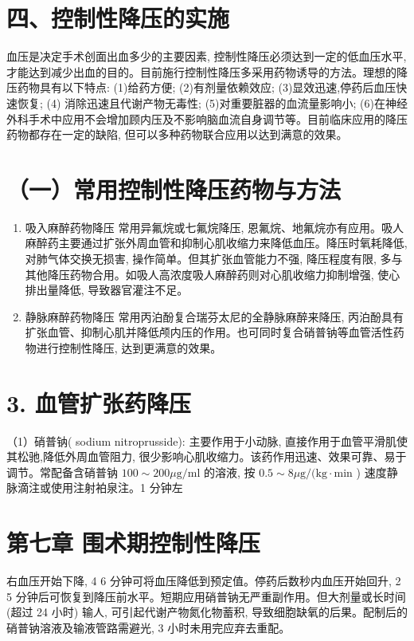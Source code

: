 \documentclass[10pt]{article}
\begin{document}
\section*{四、控制性降压的实施}
血压是决定手术创面出血多少的主要因素, 控制性降压必须达到一定的低血压水平, 才能达到减少出血的目的。目前施行控制性降压多采用药物诱导的方法。理想的降压药物具有以下特点: (1)给药方便; (2)有剂量依赖效应; (3)显效迅速,停药后血压快速恢复; (4) 消除迅速且代谢产物无毒性; (5)对重要脏器的血流量影响小; (6)在神经外科手术中应用不会增加顾内压及不影响脑血流自身调节等。目前临床应用的降压药物都存在一定的缺陷, 但可以多种药物联合应用以达到满意的效果。

\section*{（一）常用控制性降压药物与方法}
\begin{enumerate}
  \item 吸入麻醉药物降压 常用异氟烷或七氟烷降压, 恩氟烷、地氟烷亦有应用。吸人麻醉药主要通过扩张外周血管和抑制心肌收缩力来降低血压。降压时氧耗降低, 对肺气体交换无损害, 操作简单。但其扩张血管能力不强, 降压程度有限, 多与其他降压药物合用。如吸人高浓度吸人麻醉药则对心肌收缩力抑制增强, 使心排出量降低, 导致器官灌注不足。

  \item 静脉麻醉药物降压 常用丙泊酚复合瑞芬太尼的全静脉麻醉来降压, 丙泊酚具有扩张血管、抑制心肌并降低颅内压的作用。也可同时复合硝普钠等血管活性药物进行控制性降压, 达到更满意的效果。

\end{enumerate}

\section*{3. 血管扩张药降压}
（1）硝普钠( sodium nitroprusside): 主要作用于小动脉, 直接作用于血管平滑肌使其松驰,降低外周血管阻力, 很少影响心肌收缩力。该药作用迅速、效果可靠、易于调节。常配备含硝普钠 $100 \sim 200 \mu \mathrm{g} / \mathrm{ml}$ 的溶液, 按 $0.5 \sim 8 \mu \mathrm{g} /(\mathrm{kg} \cdot \mathrm{min}$ ) 速度静脉滴注或使用注射袙泉注。1 分钟左

\section*{第七章 围术期控制性降压}
右血压开始下降, 4 6 分钟可将血压降低到预定值。停药后数秒内血压开始回升, 2 5 分钟后可恢复到降压前水平。短期应用硝普钠无严重副作用。但大剂量或长时间 (超过 24 小时) 输人, 可引起代谢产物氮化物蓄积, 导致细胞缺氧的后果。配制后的硝普钠溶液及输液管路需避光, 3 小时未用完应弃去重配。
\end{document}
